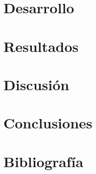 \documentclass{article}
\begin{document}
\section{Desarrollo}

\section{Resultados}

\section{Discusi\'on}

\section{Conclusiones}

\section{Bibliograf\'ia}
\end{document}
